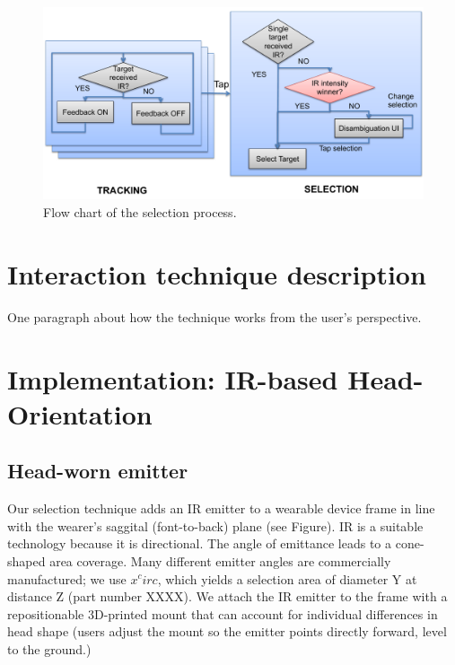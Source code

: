 
\begin{figure}[t]
\centering
\includegraphics[width=1.0\columnwidth]{figures/selectflow.pdf}
\caption{Flow chart of the selection process.}
\label{fig:selectflow}
\end{figure}

\section{Interaction technique description}
One paragraph about how the technique works from the user's perspective.
\section{Implementation: IR-based Head-Orientation}
\subsection{Head-worn emitter}
Our selection technique adds an IR emitter to a wearable device frame in line with the wearer's saggital (font-to-back) plane (see Figure). IR is a suitable technology because it is directional. The angle of emittance leads to a cone-shaped area coverage. Many different emitter angles are commercially manufactured; we use $x^circ$, which yields a selection area of diameter Y at distance Z (part number XXXX).
We attach the IR emitter to the frame with a repositionable 3D-printed mount that can account for individual differences in head shape (users adjust the mount so the emitter points directly forward, level to the ground.)

